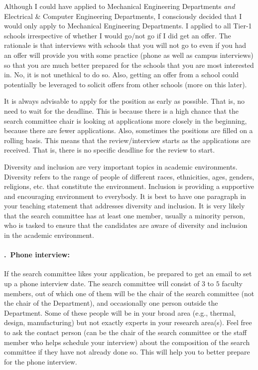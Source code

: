 \documentclass[14pt]{article}
\newcounter{myparagraph}
\renewcommand{\themyparagraph}{\arabic{myparagraph}}
\newcommand{\nparagraph}[1]{%
  \refstepcounter{myparagraph}%
  \paragraph{\themyparagraph.~#1}%
}
\begin{document}
Although I could have applied to Mechanical Engineering Departments {\it and} Electrical \& Computer Engineering Departments, I consciously decided that I would only apply to Mechanical Engineering Departments. I applied to all Tier-1 schools irrespective of whether I would go/not go if I did get an offer. The rationale is that interviews with schools that you will not go to even if you had an offer will provide you with some practice (phone as well as campus interviews) so that you are much better prepared for the schools that you are most interested in. No, it is not unethical to do so. Also, getting an offer from a school could potentially be leveraged to solicit offers from other schools (more on this later). 

It is always advisable to apply for the position as early as possible. That is, no need to wait for the deadline. This is because there is a high chance that the search committee chair is looking at applications more closely in the beginning, because there are fewer applications. Also, sometimes the positions are filled on a rolling basis. This means that the review/interview starts as the applications are received. That is, there is no specific deadline for the review to start.

Diversity and inclusion are very important topics in academic environments. Diversity refers to the range of people of different races, ethnicities, ages, genders, religions, etc. that constitute the environment. Inclusion is providing a supportive and encouraging environment to everybody. It is best to have one paragraph in your teaching statement that addresses diversity and inclusion. It is very likely that the search committee has at least one member, usually a minority person, who is tasked to ensure that the candidates are aware of diversity and inclusion in the academic environment. 

\nparagraph{Phone interview:}
If the search committee likes your application, be prepared to get an email to set up a phone interview date. The search committee will consist of $3$ to $5$ faculty members, out of which one of them will be the chair of the search committee (not the chair of the Department), and occasionally one person outside the Department. Some of these people will be in your broad area (e.g., thermal, design, manufacturing) but not exactly experts in your research area(s). Feel free to ask the contact person (can be the chair of the search committee or the staff member who helps schedule your interview) about the composition of the search committee if they have not already done so. This will help you to better prepare for the phone interview.
\end{document}
